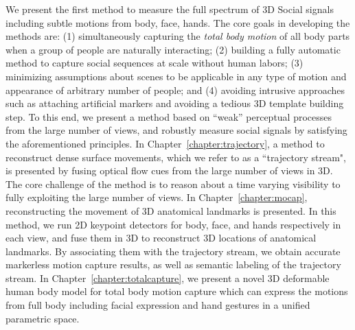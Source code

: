 We present the first method to measure the full spectrum of 3D Social signals including subtle motions from body, face, hands. The core goals in developing the methods are: (1) simultaneously capturing the \emph{total body motion} of all body parts when a group of people are naturally interacting; (2) building a fully automatic method to capture social sequences at scale without human labors; (3) minimizing assumptions about scenes to be applicable in any type of motion and appearance of arbitrary number of people; and (4) avoiding intrusive approaches such as attaching artificial markers and avoiding a tedious 3D template building step. To this end, we present a method based on ``weak'' perceptual processes from the large number of views, and robustly measure social signals by satisfying the aforementioned principles. In Chapter~\ref{chapter:trajectory}, a method to reconstruct dense surface movements, which we refer to as a ``trajectory stream", is presented by fusing optical flow cues from the large number of views in 3D. The core challenge of the method is to reason about a time varying visibility to fully exploiting the large number of views. In Chapter~\ref{chapter:mocap}, reconstructing the movement of 3D anatomical landmarks is presented. In this method, we run 2D keypoint detectors for body, face, and hands respectively in each view, and fuse them in 3D to reconstruct 3D locations of anatomical landmarks. By associating them with the trajectory stream, we obtain accurate markerless motion capture results, as well as semantic labeling of the trajectory stream.  In Chapter~\ref{chapter:totalcapture}, we present a novel 3D deformable human body model for total body motion capture which can express the motions from full body including facial expression and hand gestures in a unified parametric space. 


	



